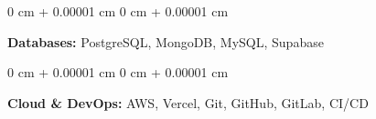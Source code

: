 \documentclass[10pt, letterpaper]{article}
\newenvironment{highlightsforbulletentries}{
    \begin{itemize}[
        topsep=0.10 cm,
        parsep=0.10 cm,
        partopsep=0pt,
        itemsep=0pt,
        leftmargin=10pt
    ]
}{
    \end{itemize}
} %
\newenvironment{onecolentry}{
    \begin{adjustwidth}{
        0 cm + 0.00001 cm
    }{
        0 cm + 0.00001 cm
    }
}{
    \end{adjustwidth}
} %
\begin{document}
        \vspace{0.2 cm}

        \begin{onecolentry}
            \textbf{Databases:} PostgreSQL, MongoDB, MySQL, Supabase
        \end{onecolentry}

        \vspace{0.2 cm}

        \begin{onecolentry}
            \textbf{Cloud \& DevOps:} AWS, Vercel, Git, GitHub, GitLab, CI/CD
        \end{onecolentry}


        


    




\end{document}
